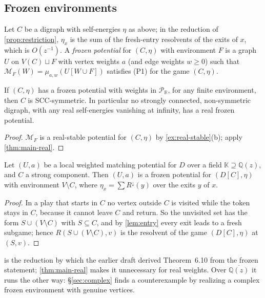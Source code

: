 \documentclass[final]{siamart0516}
\numberwithin{theorem}{section}
\numberwithin{equation}{section}
\theoremstyle{siamnonum}
\theoremstyle{plain}
\newcommand{\QQ}{\mathbb{Q}}
\newcommand{\RR}{\mathbb{R}}
\newcommand{\Qz}{\QQ(z)}
\newcommand{\Qzbar}{\overline{\QQ(z)}}
\newcommand{\Puis}{\mathcal{P}_{\RR}}
\newcommand{\Mpot}{\mathcal{M}}           %
\newcommand{\Rdown}{R^{\downarrow}}
\begin{document}
\subsection{Frozen environments}
Let $C$ be a digraph with self-energies $\eta$ as above; in the reduction of \cref{prop:restriction}, $\eta_x$ is the sum of the fresh-entry resolvents of the exits of $x$, which is $O(z^{-1})$. A \emph{frozen potential} for $(C,\eta)$ with environment $F$ is a graph $U$ on $V(C)\sqcup F$ with vertex weights $a$ (and edge weights $w\ge0$) such that $\Mpot_F(W)=\mu_{a,w}(U[W\cup F])$ satisfies \textup{(P1)} for the game $(C,\eta)$.

\begin{theorem}\label{thm:frozen-real}
If $(C,\eta)$ has a frozen potential with weights in $\Puis$, for any finite environment, then $C$ is SCC-symmetric. In particular no strongly connected, non-symmetric digraph, with any real self-energies vanishing at infinity, has a real frozen potential.
\end{theorem}
\begin{proof}
$\Mpot_F$ is a real-stable potential for $(C,\eta)$ by \cref{ex:real-stable}(b); apply \cref{thm:main-real}.
\end{proof}

\begin{proposition}\label{prop:restriction}
Let $(U,a)$ be a local weighted matching potential for $D$ over a field $\mathbb K\supseteq\Qz$, and $C$ a strong component. Then $(U,a)$ is a frozen potential for $(D[C],\eta)$ with environment $V\setminus C$, where $\eta_x=\sum\Rdown(y)$ over the exits $y$ of $x$.
\end{proposition}
\begin{proof}
In a play that starts in $C$ no vertex outside $C$ is visited while the token stays in $C$, because it cannot leave $C$ and return. So the unvisited set has the form $S\cup(V\setminus C)$ with $S\subseteq C$, and by \cref{lem:entry} every exit leads to a fresh subgame; hence $R(S\cup(V\setminus C),v)$ is the resolvent of the game $(D[C],\eta)$ at $(S,v)$.
\end{proof}

 is the reduction by which the earlier draft derived Theorem~6.10 from the frozen statement; \cref{thm:main-real} makes it unnecessary for real weights. Over $\Qzbar$ it runs the other way: \S\ref{sec:complex} finds a counterexample by realizing a complex frozen environment with genuine vertices.
\end{document}
